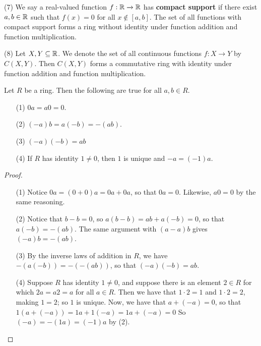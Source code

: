 \begin{example}
\item[(7)] We say a real-valued function $f:\mathbb{R} \xrightarrow{} \mathbb{R}$ has
  \textbf{compact support} if there exist $a,b \in \mathbb{R}$ such that $f(x)=0$
  for all $x \notin [a,b]$. The set of all functions with compact support
  forms a ring without identity under function addition and function
  multiplication.

\item[(8)] Let $X,Y \subseteq \mathbb{R}$. We denote the set of all continuous
  functions  $f:X \xrightarrow{} Y$ by $C(X,Y)$. Then $C(X,Y)$ forms a
  commutative ring with identity under function addition and function
  multiplication.
\end{example}

\begin{lemma}\label{lemma_5.1.1}
  Let $R$ be a ring. Then the following are true for all  $a,b \in R$.
  \begin{enumerate}
    \item[(1)] $0a=a0=0$.

    \item[(2)] $(-a)b=a(-b)=-(ab)$.

    \item[(3)] $(-a)(-b)=ab$

    \item[(4)] If $R$ has identity  $1 \neq 0$, then $1$ is unique and
      $-a=(-1)a$.
  \end{enumerate}
\end{lemma}
\begin{proof}
  \begin{enumerate}
    \item[(1)] Notice $0a=(0+0)a=0a+0a$, so that $0a=0$. Likewise, $a0=0$ by
      the same reasoning.

    \item[(2)] Notice that $b-b=0$, so $a(b-b)=ab+a(-b)=0$, so that
      $a(-b)=-(ab)$. The same argument with $(a-a)b$ gives $(-a)b=-(ab)$.

    \item[(3)] By the inverse laws of addition in $R$, we have
      $-(a(-b))=-(-(ab))$, so that $(-a)(-b)=ab$.

    \item[(4)] Suppose $R$ has identity $1 \neq 0$, and suppose there is an
      element $2 \in R$ for which  $2a=a2=a$ for all $a \in R$. Then we have
      that $1 \cdot 2=1$ and  $1 \cdot 2=2$, making  $1=2$; so  $1$ is unique.
      Now, we have that $a+(-a)=0$, so that $1(a+(-a))=1a+1(-a)=1a+(-a)=0$ So
      $(-a)=-(1a)=(-1)a$ by (2).
  \end{enumerate}
\end{proof}

